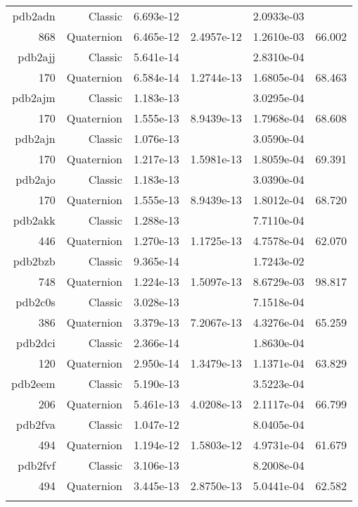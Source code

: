\begin{xltabular}{\textwidth}{r|rS[table-format=1.3e+2]S[table-format=1.4e+2]S[table-format=1.4e+2]S[table-format=-1.3]}
pdb2adn & Classic & 6.693e-12 &  & 2.0933e-03 & \\
868 & Quaternion & 6.465e-12 & 2.4957e-12 & 1.2610e-03 & 66.002\\  \addlinespace
pdb2ajj & Classic & 5.641e-14 &  & 2.8310e-04 & \\
170 & Quaternion & 6.584e-14 & 1.2744e-13 & 1.6805e-04 & 68.463\\  \addlinespace
pdb2ajm & Classic & 1.183e-13 &  & 3.0295e-04 & \\
170 & Quaternion & 1.555e-13 & 8.9439e-13 & 1.7968e-04 & 68.608\\  \addlinespace
pdb2ajn & Classic & 1.076e-13 &  & 3.0590e-04 & \\
170 & Quaternion & 1.217e-13 & 1.5981e-13 & 1.8059e-04 & 69.391\\  \addlinespace
pdb2ajo & Classic & 1.183e-13 &  & 3.0390e-04 & \\
170 & Quaternion & 1.555e-13 & 8.9439e-13 & 1.8012e-04 & 68.720\\  \addlinespace
pdb2akk & Classic & 1.288e-13 &  & 7.7110e-04 & \\
446 & Quaternion & 1.270e-13 & 1.1725e-13 & 4.7578e-04 & 62.070\\  \addlinespace
pdb2bzb & Classic & 9.365e-14 &  & 1.7243e-02 & \\
748 & Quaternion & 1.224e-13 & 1.5097e-13 & 8.6729e-03 & 98.817\\  \addlinespace
pdb2c0s & Classic & 3.028e-13 &  & 7.1518e-04 & \\
386 & Quaternion & 3.379e-13 & 7.2067e-13 & 4.3276e-04 & 65.259\\  \addlinespace
pdb2dci & Classic & 2.366e-14 &  & 1.8630e-04 & \\
120 & Quaternion & 2.950e-14 & 1.3479e-13 & 1.1371e-04 & 63.829\\  \addlinespace
pdb2eem & Classic & 5.190e-13 &  & 3.5223e-04 & \\
206 & Quaternion & 5.461e-13 & 4.0208e-13 & 2.1117e-04 & 66.799\\  \addlinespace
pdb2fva & Classic & 1.047e-12 &  & 8.0405e-04 & \\
494 & Quaternion & 1.194e-12 & 1.5803e-12 & 4.9731e-04 & 61.679\\  \addlinespace
pdb2fvf & Classic & 3.106e-13 &  & 8.2008e-04 & \\
494 & Quaternion & 3.445e-13 & 2.8750e-13 & 5.0441e-04 & 62.582\\  \addlinespace

\end{xltabular}
